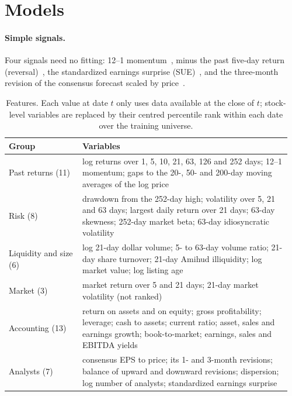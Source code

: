 \section{Models}
\label{sec:models}

\paragraph{Simple signals.}
Four signals need no fitting: 12--1 momentum~\cite{jegadeesh1993returns}, minus the past five-day return (reversal)~\cite{jegadeesh1990evidence}, the standardized earnings surprise (SUE)~\cite{livnat2006comparing}, and the three-month revision of the consensus forecast scaled by price~\cite{chan1996momentum}.

\begin{table}[t]
\caption{Features. Each value at date $t$ only uses data available at the close of $t$; stock-level variables are replaced by their centred percentile rank within each date over the training universe.}
\label{tab:features}
\footnotesize
\begin{tabular}{@{}p{0.25\linewidth}p{0.71\linewidth}@{}}
\toprule
Group & Variables \\
\midrule
Past returns (11) & log returns over 1, 5, 10, 21, 63, 126 and 252 days; 12--1 momentum; gaps to the 20-, 50- and 200-day moving averages of the log price \\
Risk (8) & drawdown from the 252-day high; volatility over 5, 21 and 63 days; largest daily return over 21 days; 63-day skewness; 252-day market beta; 63-day idiosyncratic volatility \\
Liquidity and size (6) & log 21-day dollar volume; 5- to 63-day volume ratio; 21-day share turnover; 21-day Amihud illiquidity; log market value; log listing age \\
Market (3) & market return over 5 and 21 days; 21-day market volatility (not ranked) \\
Accounting (13) & return on assets and on equity; gross profitability; leverage; cash to assets; current ratio; asset, sales and earnings growth; book-to-market; earnings, sales and EBITDA yields \\
Analysts (7) & consensus EPS to price; its 1- and 3-month revisions; balance of upward and downward revisions; dispersion; log number of analysts; standardized earnings surprise \\
\bottomrule
\end{tabular}
\end{table}

